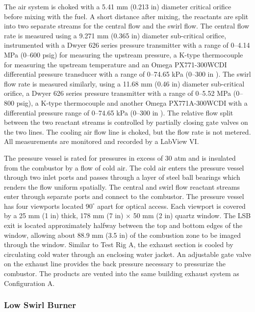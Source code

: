 The air system is choked with a 5.41 mm (0.213 in) diameter critical orifice before mixing with the fuel.
A short distance after mixing, the reactants are split into two separate streams for the central flow and the swirl flow.
The central flow rate is measured using a 9.271 mm (0.365 in) diameter sub-critical orifice, instrumented with a Dwyer 626 series pressure transmitter with a range of 0--4.14 MPa (0--600 psig) for measuring the upstream pressure, a K-type thermocouple for measuring the upstream temperature and an Omega PX771-300WCDI differential pressure transducer with a range of 0--74.65 kPa (0--300 in ).
The swirl flow rate is measured similarly, using a 11.68 mm (0.46 in) diameter sub-critical orifice, a Dwyer 626 series pressure transmitter with a range of 0--5.52 MPa (0--800 psig), a K-type thermocouple and another Omega PX771A-300WCDI with a differential pressure range of 0--74.65 kPa (0--300 in ).
The relative flow split between the two reactant streams is controlled by partially closing gate valves on the two lines. The cooling air flow line is choked, but the flow rate is not metered.
All measurements are monitored and recorded by a LabView VI.

The pressure vessel is rated for pressures in excess of 30 atm and is insulated from the combustor by a flow of cold air.
The cold air enters the pressure vessel through two inlet ports and passes through a layer of steel ball bearings which renders the flow uniform spatially.
The central and swirl flow reactant streams enter through separate ports and connect to the combustor.
The pressure vessel has four viewports located \(90^\circ\) apart for optical access.
Each viewport is covered by a 25 mm (1 in) thick, 178 mm (7 in) \(\times\) 50 mm (2 in) quartz window.
The LSB exit is located approximately halfway between the top and bottom edges of the window, allowing about 88.9 mm (3.5 in) of the combustion zone to be imaged through the window.
Similar to Test Rig A, the exhaust section is cooled by circulating cold water through an enclosing water jacket.
An adjustable gate valve on the exhaust line provides the back pressure necessary to pressurize the combustor.
The products are vented into the same building exhaust system as Configuration A.

\subsubsection{Low Swirl Burner}
\label{subsubsec:configuration-b-low-swirl-burner}

